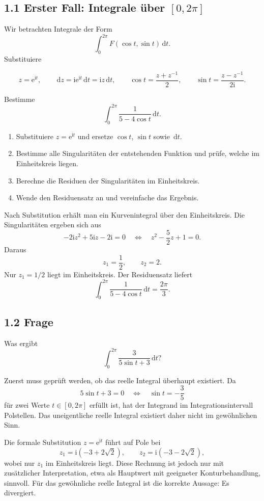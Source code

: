 \documentclass[11pt,a4paper]{article}
\newcommand{\ii}{\mathrm i}
\newcommand{\ee}{\mathrm e}
\newcommand{\dd}{\,\mathrm d}
\begin{document}
\subsection{1.1 Erster Fall: Integrale über $[0,2\pi]$}
Wir betrachten Integrale der Form
\[
\int_0^{2\pi}F(\cos t,\sin t)\dd t.
\]
Substituiere
\begin{importantbox}
\[
z=\ee^{\ii t},
\qquad
\dd z=\ii\ee^{\ii t}\dd t=\ii z\dd t,
\qquad
\cos t=\frac{z+z^{-1}}{2},
\qquad
\sin t=\frac{z-z^{-1}}{2\ii}.
\]
\end{importantbox}

\begin{beispielbox}
Bestimme
\[
\int_0^{2\pi}\frac1{5-4\cos t}\dd t.
\]
\end{beispielbox}
\begin{kochrezeptbox}
\begin{enumerate}[label=\Roman*.]
\item Substituiere $z=\ee^{\ii t}$ und ersetze $\cos t$, $\sin t$ sowie $\dd t$.
\item Bestimme alle Singularitäten der entstehenden Funktion und prüfe, welche im Einheitskreis liegen.
\item Berechne die Residuen der Singularitäten im Einheitskreis.
\item Wende den Residuensatz an und vereinfache das Ergebnis.
\end{enumerate}
\end{kochrezeptbox}
Nach Substitution erhält man ein Kurvenintegral über den Einheitskreis. Die Singularitäten ergeben sich aus
\[
-2\ii z^2+5\ii z-2\ii=0
\quad\Longleftrightarrow\quad
z^2-\frac52z+1=0.
\]
Daraus
\[
z_1=\frac12,
\qquad z_2=2.
\]
Nur $z_1=1/2$ liegt im Einheitskreis. Der Residuensatz liefert
\[
\int_0^{2\pi}\frac1{5-4\cos t}\dd t=\frac{2\pi}{3}.
\]

\subsection{1.2 Frage}
\begin{fragebox}
Was ergibt
\[
\int_0^{2\pi}\frac{3}{5\sin t+3}\dd t?
\]
\end{fragebox}
\begin{antwortbox}
Zuerst muss geprüft werden, ob das reelle Integral überhaupt existiert. Da
\[
5\sin t+3=0
\quad\Longleftrightarrow\quad
\sin t=-\frac35
\]
für zwei Werte $t\in[0,2\pi]$ erfüllt ist, hat der Integrand im Integrationsintervall Polstellen. Das uneigentliche reelle Integral existiert daher nicht im gewöhnlichen Sinn.

Die formale Substitution $z=\ee^{\ii t}$ führt auf Pole bei
\[
z_1=\ii(-3+2\sqrt2),
\qquad
z_2=\ii(-3-2\sqrt2),
\]
wobei nur $z_1$ im Einheitskreis liegt. Diese Rechnung ist jedoch nur mit zusätzlicher Interpretation, etwa als Hauptwert mit geeigneter Konturbehandlung, sinnvoll. Für das gewöhnliche reelle Integral ist die korrekte Aussage: Es divergiert.
\end{antwortbox}
\end{document}
